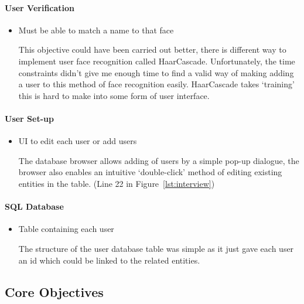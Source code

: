 \documentclass[a4paper]{article}
\begin{document}
		\paragraph{User Verification}
			\begin{itemize}

				\item Must be able to match a name to that face

				This objective could have been carried out better, there is different way to implement user face recognition called HaarCascade. 
				Unfortunately, the time constraints didn't give me enough time to find a valid way of making adding a user to this method of face
				recognition easily. HaarCascade takes `training' this is hard to make into some form of user interface.


			\end{itemize}

		\paragraph{User Set-up}

			\begin{itemize}
				\item UI to edit each user or add users

				The database browser allows adding of users by a simple pop-up dialogue, the browser also enables an intuitive `double-click' method
				of editing existing entities in the table. (Line 22 in Figure~\ref{lst:interview})

			\end{itemize}


		\paragraph{SQL Database}
		
			\begin{itemize}
				\item Table containing each user

				The structure of the user database table was simple as it just gave each user an id which could be linked to the related entities.

			\end{itemize}

	\subsection{Core Objectives}
		
\end{document}
